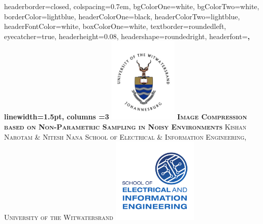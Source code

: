 \documentclass[landscape,a0paper,fontscale=0.4]{baposter} %
\begin{document}
\begin{poster}
{
headerborder=closed, %
colspacing=0.7em, %
bgColorOne=white, %
bgColorTwo=white, %
borderColor=lightblue, %
headerColorOne=black, %
headerColorTwo=lightblue, %
headerFontColor=white, %
boxColorOne=white, %
textborder=roundedleft, %
eyecatcher=true, %
headerheight=0.08\textheight, %
headershape=roundedright, %
headerfont=\Large\bf\textsc, %
linewidth=1.5pt, %
columns =3
}
%
{\includegraphics[height=11em]{wits.jpg}} %
{\bf\textsc{Image Compression based on Non-Parametric Sampling in Noisy Environments}\vspace{0.3em}} %
{\textsc{Kishan Narotam \& Nitesh Nana \hspace{12pt} {\small School of Electrical \& Information Engineering, University of the Witwatersrand}}} %
	{\includegraphics[height=11em]{EIE.pdf}} %


\end{poster}
\end{document}
